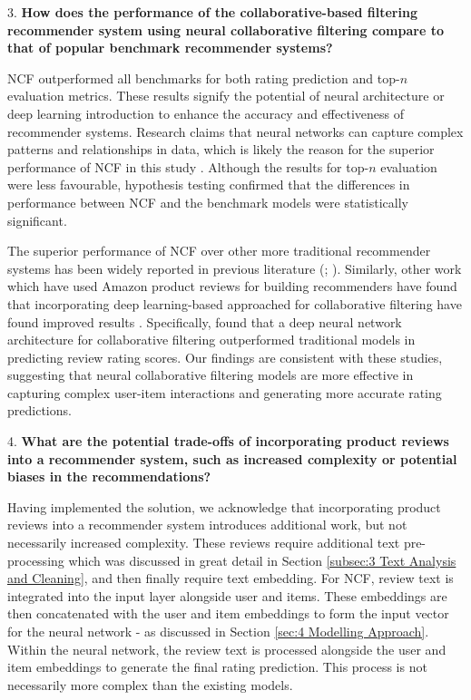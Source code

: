 3. \textbf{How does the performance of the collaborative-based filtering recommender system using neural collaborative filtering compare to that of popular benchmark recommender systems?}

NCF outperformed all benchmarks for both rating prediction and top-$n$ evaluation metrics. These results signify the potential of neural architecture or deep learning introduction to enhance the accuracy and effectiveness of recommender systems. Research claims that neural networks can capture complex patterns and relationships in data, which is likely the reason for the superior performance of NCF in this study \cite{he2017neural}. Although the results for top-$n$ evaluation were less favourable, hypothesis testing confirmed that the differences in performance between NCF and the benchmark models were statistically significant. 

The superior performance of NCF over other more traditional recommender systems has been widely reported in previous literature (\cite{he2017neural}; \cite{rendle2020neural}). Similarly, other work which have used Amazon product reviews for building recommenders have found that incorporating deep learning-based approached for collaborative filtering have found improved results \cite{rezaei2021amazon}. Specifically, \cite{rezaei2021amazon} found that a deep neural network architecture for collaborative filtering outperformed traditional models in predicting review rating scores. Our findings are consistent with these studies, suggesting that neural collaborative filtering models are more effective in capturing complex user-item interactions and generating more accurate rating predictions.


4. \textbf{What are the potential trade-offs of incorporating product reviews into a recommender system, such as increased complexity or potential biases in the recommendations?}

Having implemented the solution, we acknowledge that incorporating product reviews into a recommender system introduces additional work, but not necessarily increased complexity. These reviews require additional text pre-processing which was discussed in great detail in Section \ref{subsec:3 Text Analysis and Cleaning}, and then finally require text embedding. For NCF, review text is integrated into the input layer alongside user and items.  These embeddings are then concatenated with the user and item embeddings to form the input vector for the neural network - as discussed in Section \ref{sec:4 Modelling Approach}. Within the neural network, the review text is processed alongside the user and item embeddings to generate the final rating prediction. This process is not necessarily more complex than the existing models.

